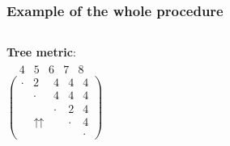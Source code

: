 \begin{frame}
\frametitle{Example of the whole procedure}
\begin{columns}[T]%
	\textbf{Tree metric}:\\
	$\begin{array}{ccccc}
	\ \ \; \textit{4} & \textit{5} & \textit{6} & \textit{7} & \textit{8}
	\end{array}$\\
	$
		\left(		
		\begin{array}{ccccc}
		\cdot & 2 & 4 & 4 & 4 \\
		& \cdot & 4 & 4 & 4 \\
		&   & \cdot & 2 & 4 \\
		& \upuparrows & & \cdot & 4\\
		&   &   &   & \cdot
		\end{array}
		\right)
	$ 
\end{columns}
\end{frame}


